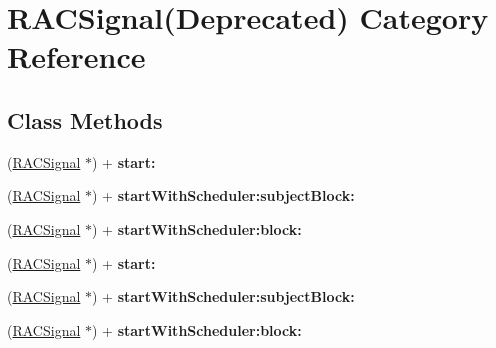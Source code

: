 \hypertarget{category_r_a_c_signal_07_deprecated_08}{}\section{R\+A\+C\+Signal(Deprecated) Category Reference}
\label{category_r_a_c_signal_07_deprecated_08}
\subsection*{Class Methods}
\begin{DoxyCompactItemize}
\item 
\mbox{\label{category_r_a_c_signal_07_deprecated_08_a0951a904f858019067c4363ede032431}} 
(\mbox{\hyperlink{interface_r_a_c_signal}{R\+A\+C\+Signal}} $\ast$) + {\bfseries start\+:}
\item 
\mbox{\label{category_r_a_c_signal_07_deprecated_08_aba6b849d98a4e495d04e0124b3f3bcdb}} 
(\mbox{\hyperlink{interface_r_a_c_signal}{R\+A\+C\+Signal}} $\ast$) + {\bfseries start\+With\+Scheduler\+:subject\+Block\+:}
\item 
\mbox{\label{category_r_a_c_signal_07_deprecated_08_a06ac2ec4a0d7d06cfc61b0ba934a31ac}} 
(\mbox{\hyperlink{interface_r_a_c_signal}{R\+A\+C\+Signal}} $\ast$) + {\bfseries start\+With\+Scheduler\+:block\+:}
\item 
\mbox{\label{category_r_a_c_signal_07_deprecated_08_a0951a904f858019067c4363ede032431}} 
(\mbox{\hyperlink{interface_r_a_c_signal}{R\+A\+C\+Signal}} $\ast$) + {\bfseries start\+:}
\item 
\mbox{\label{category_r_a_c_signal_07_deprecated_08_aba6b849d98a4e495d04e0124b3f3bcdb}} 
(\mbox{\hyperlink{interface_r_a_c_signal}{R\+A\+C\+Signal}} $\ast$) + {\bfseries start\+With\+Scheduler\+:subject\+Block\+:}
\item 
\mbox{\label{category_r_a_c_signal_07_deprecated_08_a06ac2ec4a0d7d06cfc61b0ba934a31ac}} 
(\mbox{\hyperlink{interface_r_a_c_signal}{R\+A\+C\+Signal}} $\ast$) + {\bfseries start\+With\+Scheduler\+:block\+:}

\end{DoxyCompactItemize}
